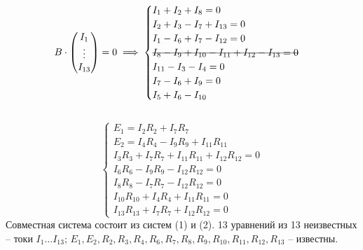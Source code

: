 \documentclass[12pt,a4paper]{article}
\begin{document}
\begin{equation}
   B \cdot \begin{pmatrix}
      I_1 \\
      \vdots \\
      I_{13}
   \end{pmatrix} = 0 \implies \begin{cases}
      I_1 + I_2 + I_8 = 0 \\
      I_2 + I_3 - I_7 + I_{13} = 0 \\
      I_1 - I_6 + I_7 - I_{12} = 0 \\
      \hbox{\sout{$I_8 - I_9 + I_{10} - I_{11} + I_{12} - I_{13} = 0$}} \\
      I_{11} - I_3 - I_4 = 0 \\
      I_7 - I_6 + I_9 = 0 \\
      I_5 + I_6 - I_{10}
   \end{cases}
\end{equation} \\
\begin{equation}
   \begin{cases}
      E_1 = I_2R_2 + I_7R_7 \\
      E_2 = I_4R_4 - I_9R_9 + I_{11}R_{11} \\
      I_3R_3 + I_7R_7 + I_{11}R_{11} + I_{12}R_{12} = 0 \\
      I_6R_6 - I_9R_9 - I_{12}R_{12} = 0 \\
      I_8R_8 - I_7R_7 - I_{12}R_{12} = 0 \\
      I_{10}R_{10} + I_4R_4 + I_{11}R_{11} = 0 \\
      I_{13}R_{13} + I_7R_7 + I_{12}R_{12} = 0
   \end{cases}
\end{equation}
Совместная система состоит из систем (1) и (2). 13 уравнений из 13 неизвестных -- токи $I_1 \dots I_{13}; \, E_1, E_2, R_2, R_3, R_4, R_6, R_7, R_8, R_9, R_{10}, R_{11}, R_{12}, R_{13}$ -- известны.


\end{document}
